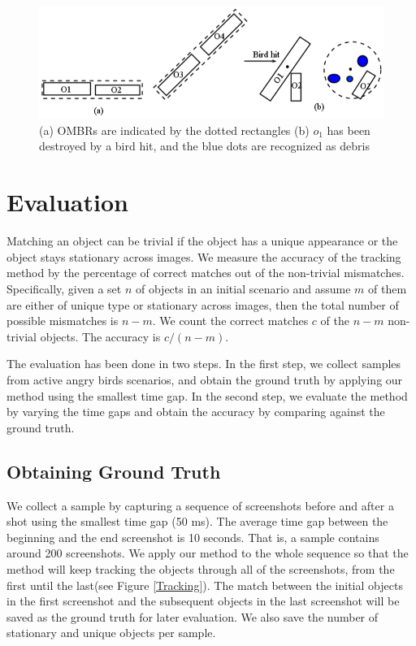 \documentclass[letterpaper]{article}
\begin{document}
\begin{figure}[t!]
\centering\includegraphics[scale=0.3]{OMBRs.png}\caption{(a) OMBRs are indicated by the dotted rectangles (b) $o_1$ has been destroyed by a bird hit, and the blue dots are recognized as debris}  
\label{OMBRs}
\end{figure}


\section{Evaluation}

Matching an object can be trivial if the object has a unique appearance or the object stays stationary across images. We measure the accuracy of the tracking method by the percentage of correct matches out of the non-trivial mismatches. Specifically, given a set $n$ of objects in an initial scenario and assume $m$ of them are either of unique type or stationary across images, then the total number of possible mismatches is $n - m$. We count the correct matches $c$ of the $n - m$ non-trivial objects. The accuracy is  $c / (n - m)$.

The evaluation has been done in two steps. In the first step, we collect samples from active angry birds scenarios, and obtain the ground truth by applying our method using the smallest time gap. In the second step, we evaluate the method by varying the time gaps and obtain the accuracy by comparing against the ground truth.

 
\subsection{Obtaining Ground Truth}

We collect a sample by capturing a sequence of screenshots before and after a shot using the smallest time gap (50 ms). The average time gap between the beginning and the end screenshot is 10 seconds. That is, a sample contains around 200 screenshots.  We apply our method to the whole sequence so that the method will keep tracking the objects through all of the screenshots, from the first until the last(see Figure \ref{Tracking}). The match between the initial objects in the first screenshot and the subsequent objects in the last screenshot will be saved as the ground truth for later evaluation. We also save the number of stationary and unique objects per sample.
\end{document}
